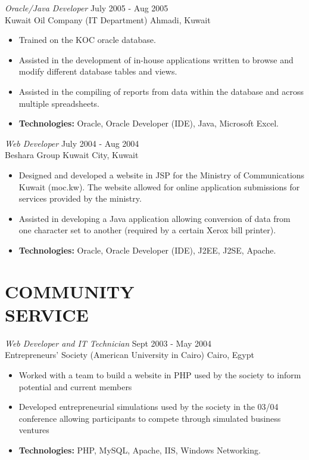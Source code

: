 \documentclass[line,margin]{res}
\begin{document}
\begin{resume}
    {\sl Oracle/Java Developer} \hfill July 2005 - Aug 2005 \\
    Kuwait Oil Company  (IT Department) \hfill  Ahmadi, Kuwait
    \smallskip
        \begin{itemize}  \itemsep -2pt %
    \item Trained on the KOC oracle database.
    \item Assisted in the development of in-house applications written to
        browse and \\ modify different database tables and views.
    \item Assisted in the compiling of reports from data within the database
        and across multiple spreadsheets.
    \item {\bf Technologies:} \hspace{3pt}
        Oracle, Oracle Developer (IDE), Java, Microsoft Excel.
        \end{itemize}

    {\sl Web Developer} \hfill July 2004 - Aug 2004 \\
    Beshara Group \hfill Kuwait City, Kuwait
    \smallskip
        \begin{itemize}  \itemsep -2pt %
    \item Designed and developed a website in JSP for the Ministry of
        Communications Kuwait (moc.kw). The website allowed for online
        application submissions for services provided by the ministry.
    \item Assisted in developing a Java application allowing conversion of data
        from one character set to another (required by a certain Xerox bill
        printer).
    \item {\bf Technologies:} \hspace{3pt}
        Oracle, Oracle Developer (IDE), J2EE, J2SE, Apache.
        \end{itemize}
    
\section{COMMUNITY \\ SERVICE}
    {\sl Web Developer and IT Technician} \hfill Sept 2003 - May 2004 \\
    Entrepreneurs' Society (American University in Cairo) \hfill Cairo, Egypt \smallskip
        \begin{itemize}  \itemsep -2pt %
\item Worked with a team to build a website in PHP used by the society to
    inform potential and current members
\item Developed entrepreneurial simulations used by the society in the 
    03/04 \\ conference allowing participants to compete through simulated 
    business \\ ventures
    \item {\bf Technologies:} \hspace{1pt}
        PHP, MySQL, Apache, IIS, Windows Networking.
        \end{itemize}


\end{resume}
\end{document}
